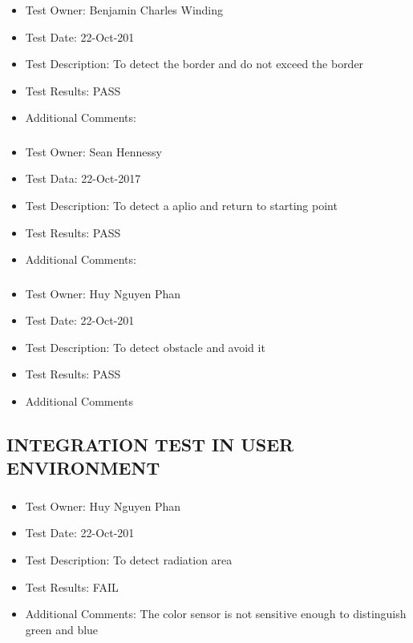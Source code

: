 \documentclass[10pt,a4paper,titlepage]{article}
\begin{document}
	\subsubsection{}
\begin{itemize}
\item Test Owner: Benjamin Charles Winding
\item Test Date: 22-Oct-201
\item Test Description: To detect the border and do not exceed the border
\item Test Results: PASS
\item Additional Comments:
\end{itemize}		
	
	\subsubsection{}
\begin{itemize}
\item Test Owner: Sean Hennessy
\item Test Data: 22-Oct-2017
\item Test Description: To detect a aplio and return to starting point
\item Test Results: PASS 
\item Additional Comments: 

\end{itemize}

	\subsubsection{}
\begin{itemize}
\item Test Owner:  Huy Nguyen Phan
\item Test Date: 22-Oct-201
\item Test Description: To detect obstacle and avoid it 
\item Test Results: PASS
\item Additional Comments	
\end{itemize}

\subsection{INTEGRATION TEST IN USER ENVIRONMENT}
	\subsubsection{}
\begin{itemize}
	\item Test Owner:  Huy Nguyen Phan
	\item Test Date: 22-Oct-201
	\item Test Description: To detect radiation area 
	\item Test Results: FAIL
	\item Additional Comments: The color sensor is not sensitive enough to distinguish green and blue
	
\end{itemize}
\end{document}
